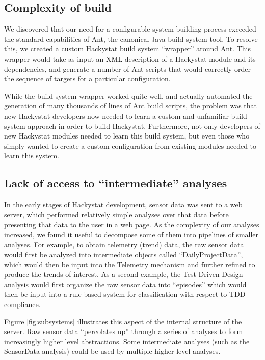 \documentclass[conference,compsoc]{IEEEtran}
\begin{document}
\subsection{Complexity of build}

We discovered that our need for a configurable system building process
exceeded the standard capabilities of Ant, the canonical Java build system
tool.  To resolve this, we created a custom Hackystat build system
``wrapper'' around Ant.  This wrapper would take as input an XML
description of a Hackystat module and its dependencies, and generate a
number of Ant scripts that would correctly order the sequence of targets
for a particular configuration.

While the build system wrapper worked quite well, and actually automated
the generation of many thousands of lines of Ant build scripts, the problem
was that new Hackystat developers now needed to learn a custom and
unfamiliar build system approach in order to build Hackystat.  Furthermore,
not only developers of new Hackystat modules needed to learn this build
system, but even those who simply wanted to create a custom configuration
from existing modules needed to learn this system.


\subsection{Lack of access to ``intermediate'' analyses}

In the early stages of Hackystat development, sensor data was sent to a web
server, which performed relatively simple analyses over that data before
presenting that data to the user in a web page.  As the complexity of our
analyses increased, we found it useful to decompose some of them into
pipelines of smaller analyses.  For example, to obtain telemetry (trend)
data, the raw sensor data would first be analyzed into intermediate objects
called ``DailyProjectData'', which would then be input into the Telemetry
mechanism and further refined to produce the trends of interest.  As a
second example, the Test-Driven Design analysis would first organize the
raw sensor data into ``episodes'' which would then be input into a
rule-based system for classification with respect to TDD compliance.

Figure \ref{fig:subsystems} illustrates this aspect of the internal structure
of the server.  Raw sensor data ``percolates up'' through a series of analyses
to form increasingly higher level abstractions.  Some intermediate analyses 
(such as the SensorData analysis) could be used by multiple higher level analyses.
\end{document}
